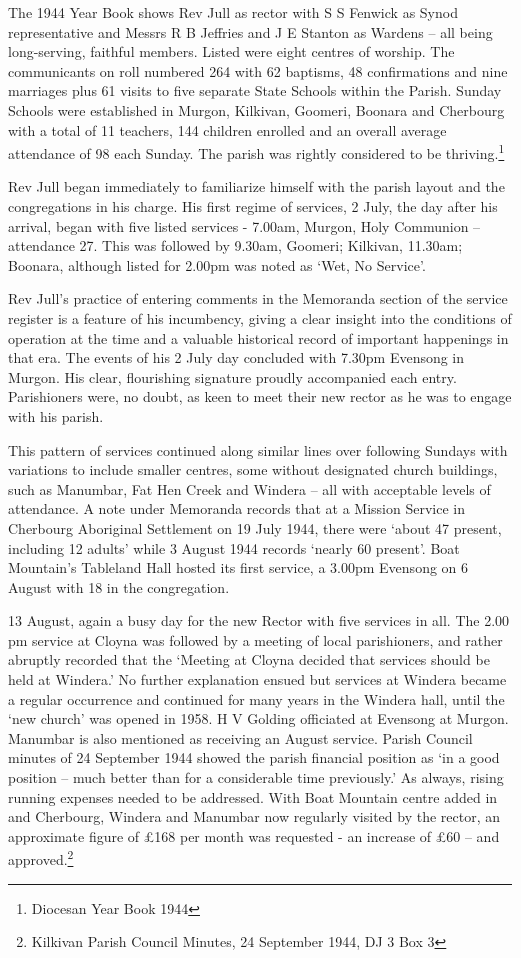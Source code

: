 The 1944 Year Book shows Rev Jull as rector with S S Fenwick as Synod
representative and Messrs R B Jeffries and J E Stanton as Wardens -- all
being long-serving, faithful members. Listed were eight centres of
worship. The communicants on roll numbered 264 with 62 baptisms, 48
confirmations and nine marriages plus 61 visits to five separate State
Schools within the Parish. Sunday Schools were established in Murgon,
Kilkivan, Goomeri, Boonara and Cherbourg with a total of 11 teachers,
144 children enrolled and an overall average attendance of 98 each
Sunday. The parish was rightly considered to be thriving.\footnote{Diocesan
  Year Book 1944}

Rev Jull began immediately to familiarize himself with the parish layout
and the congregations in his charge. His first regime of services, 2
July, the day after his arrival, began with five listed services -
7.00am, Murgon, Holy Communion -- attendance 27. This was followed by
9.30am, Goomeri; Kilkivan, 11.30am; Boonara, although listed for 2.00pm
was noted as `Wet, No Service'.

Rev Jull's practice of entering comments in the Memoranda section of the
service register is a feature of his incumbency, giving a clear insight
into the conditions of operation at the time and a valuable historical
record of important happenings in that era. The events of his 2 July day
concluded with 7.30pm Evensong in Murgon. His clear, flourishing
signature proudly accompanied each entry. Parishioners were, no doubt,
as keen to meet their new rector as he was to engage with his parish.

This pattern of services continued along similar lines over following
Sundays with variations to include smaller centres, some without
designated church buildings, such as Manumbar, Fat Hen Creek and Windera
-- all with acceptable levels of attendance. A note under Memoranda
records that at a Mission Service in Cherbourg Aboriginal Settlement on
19 July 1944, there were `about 47 present, including 12 adults' while 3
August 1944 records `nearly 60 present'. Boat Mountain's Tableland Hall
hosted its first service, a 3.00pm Evensong on 6 August with 18 in the
congregation.

13 August, again a busy day for the new Rector with five services in
all. The 2.00 pm service at Cloyna was followed by a meeting of local
parishioners, and rather abruptly recorded that the `Meeting at Cloyna
decided that services should be held at Windera.' No further explanation
ensued but services at Windera became a regular occurrence and continued
for many years in the Windera hall, until the `new church' was opened in
1958. H V Golding officiated at Evensong at Murgon. Manumbar is also
mentioned as receiving an August service. Parish Council minutes of 24
September 1944 showed the parish financial position as `in a good
position -- much better than for a considerable time previously.' As
always, rising running expenses needed to be addressed. With Boat
Mountain centre added in and Cherbourg, Windera and Manumbar now
regularly visited by the rector, an approximate figure of \pounds168 per month
was requested - an increase of \pounds60 -- and approved.\footnote{Kilkivan
  Parish Council Minutes, 24 September 1944, DJ 3 Box 3}

